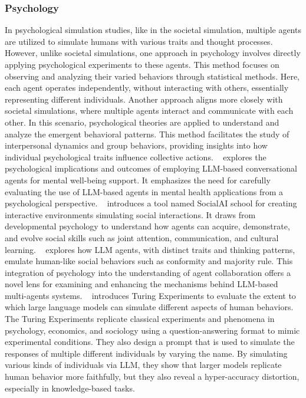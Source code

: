 \subsubsection{Psychology}
In psychological simulation studies, like in the societal simulation, multiple agents are utilized to simulate humans with various traits and thought processes. However, unlike societal simulations, one approach in psychology involves directly applying psychological experiments to these agents. This method focuses on observing and analyzing their varied behaviors through statistical methods. Here, each agent operates independently, without interacting with others, essentially representing different individuals. Another approach aligns more closely with societal simulations, where multiple agents interact and communicate with each other. In this scenario, psychological theories are applied to understand and analyze the emergent behavioral patterns. This method facilitates the study of interpersonal dynamics and group behaviors, providing insights into how individual psychological traits influence collective actions.
~\cite{ma2023understanding} explores the psychological implications and outcomes of employing LLM-based conversational agents for mental well-being support. It emphasizes the need for carefully evaluating the use of LLM-based agents in mental health applications from a psychological perspective. 
~\cite{kovavc2023socialai} introduces a tool named SocialAI school for creating interactive environments simulating social interactions. It draws from developmental psychology to understand how agents can acquire, demonstrate, and evolve social skills such as joint attention, communication, and cultural learning. 
~\cite{zhang2023exploring} explores how LLM agents, with distinct traits and thinking patterns, emulate human-like social behaviors such as conformity and majority rule. This integration of psychology into the understanding of agent collaboration offers a novel lens for examining and enhancing the mechanisms behind LLM-based multi-agents systems.
~\cite{aher2023using} introduces Turing Experiments to evaluate the extent to which large language models can simulate different aspects of human behaviors. The Turing Experiments replicate classical experiments and phenomena in psychology, economics, and sociology using a question-answering format to mimic experimental conditions. They also design a prompt that is used to simulate the responses of multiple
different individuals by varying the name. By simulating various kinds of individuals via LLM, they show that larger models replicate human behavior more faithfully, but they also reveal a hyper-accuracy distortion, especially in knowledge-based tasks. 


